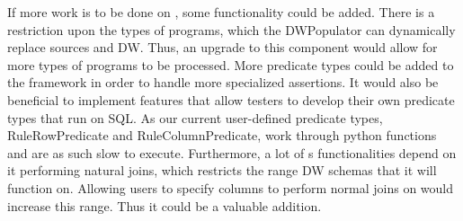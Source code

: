 If more work is to be done on \FW{}, some functionality could be added. There is a restriction upon the types of programs, which the DWPopulator can dynamically replace sources and DW. Thus, an upgrade to this component would allow for more types of programs to be processed. More predicate types could be added to the framework in order to handle more specialized assertions. It would also be beneficial to implement features that allow testers to develop their own predicate types that run on SQL. As our current user-defined predicate types, RuleRowPredicate and RuleColumnPredicate, work through python functions and are as such slow to execute. Furthermore, a lot of \FW{}s functionalities depend on it performing natural joins, which restricts the range DW schemas that it will function on. Allowing users to specify columns to perform normal joins on would increase this range. Thus it could be a valuable addition.





